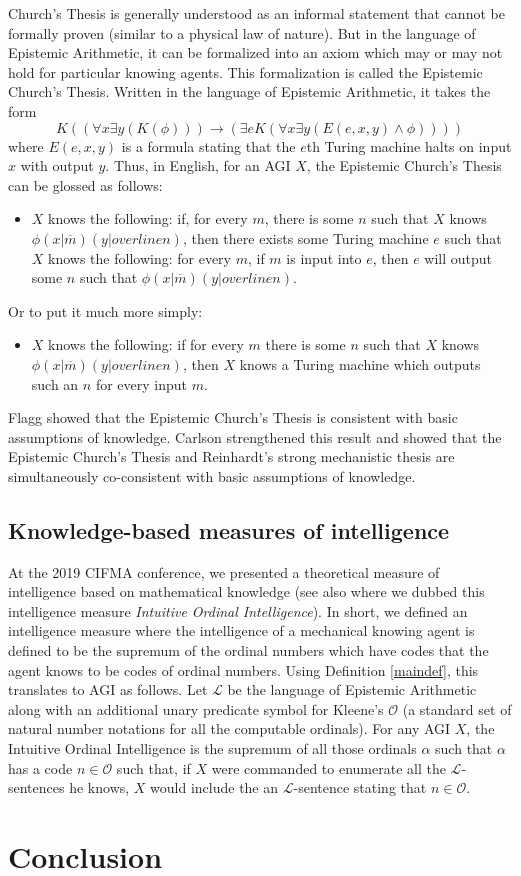 \documentclass[runningheads]{llncs}
\begin{document}
Church's Thesis is generally understood as an informal statement that cannot
be formally proven (similar to a physical law of nature).
But in the language of Epistemic Arithmetic, it can be formalized into an
axiom which may or may not hold for particular knowing agents. This formalization
is called the Epistemic Church's Thesis. Written in the language of Epistemic
Arithmetic, it takes the form
\[
  K( ( \forall x\exists y (K(\phi))  ) \rightarrow
  ( \exists e K( \forall x\exists y ( E(e,x,y) \wedge \phi  )  )  )  )
\]
where $E(e,x,y)$ is a formula stating that the $e$th Turing machine
halts on input $x$ with output $y$.
Thus, in English, for an AGI $X$,
the Epistemic Church's Thesis can be glossed as follows:
\begin{itemize}
  \item
  $X$ knows the following: if, for every $m$, there is some $n$ such that
  $X$ knows $\phi(x|\overline m)(y|overline n)$, then there exists some
  Turing machine $e$ such that $X$ knows the following:
  for every $m$, if $m$ is input into $e$, then $e$ will output
  some $n$ such that $\phi(x|\overline m)(y|overline n)$.
\end{itemize}
Or to put it much more simply:
\begin{itemize}
  \item
  $X$ knows the following: if for every $m$ there is some $n$ such that
  $X$ knows $\phi(x|\overline m)(y|overline n)$, then $X$ knows a Turing
  machine which outputs such an $n$ for every input $m$.
\end{itemize}
Flagg showed \cite{flagg1985church} that the Epistemic Church's Thesis is
consistent with basic assumptions of knowledge. Carlson strengthened this
result and showed \cite{carlson2016collapsing} that the Epistemic Church's
Thesis and Reinhardt's strong mechanistic thesis are simultaneously
co-consistent with basic assumptions of knowledge.

\subsection{Knowledge-based measures of intelligence}

At the 2019 CIFMA conference, we presented \cite{alexander2019measuring}
a theoretical measure of intelligence based on mathematical knowledge
(see also \cite{alexander2020agi} where we dubbed this intelligence
measure \emph{Intuitive Ordinal Intelligence}).
In short, we defined an intelligence measure where the intelligence of
a mechanical knowing agent is defined to be the supremum of the
ordinal numbers which have codes that the agent knows to be codes
of ordinal numbers. Using Definition \ref{maindef}, this translates
to AGI as follows. Let $\mathscr L$ be the language of Epistemic Arithmetic
along with an additional unary predicate symbol for Kleene's $\mathcal O$
(a standard set of natural number notations for all the computable
ordinals). For any AGI $X$, the Intuitive Ordinal Intelligence is the
supremum of all those ordinals $\alpha$ such that $\alpha$ has a code
$n\in\mathcal O$ such that, if $X$ were commanded to enumerate all the
$\mathscr L$-sentences he knows, $X$ would include the an $\mathscr L$-sentence
stating that $n\in\mathcal O$.


\section{Conclusion}
\label{conclusionsection}



\end{document}
